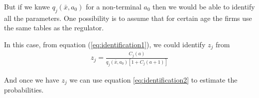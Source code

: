 \documentclass[12pt]{article}
\theoremstyle{plain}
\theoremstyle{plain}
\begin{document}
But if we knwe $ q_j(\bar{x},a_0)$ for a non-terminal $a_0$ then we would be able to identify all the parameters. One possibility is to assume that for certain age the firms use the same tables as the regulator. 

In this case, from equation (\ref{eq:identification1}), we could identify $z_j$ from 
\begin{align}\label{eq:identification3}
     z_j  =\frac{C_j(a)}{ q_j(\bar{x}, a_0)[1+C_j(a+1)]}
\end{align}

And once we have $z_j$ we can use equation \ref{eq:identification2} to estimate the probabilities. 
\end{document}
